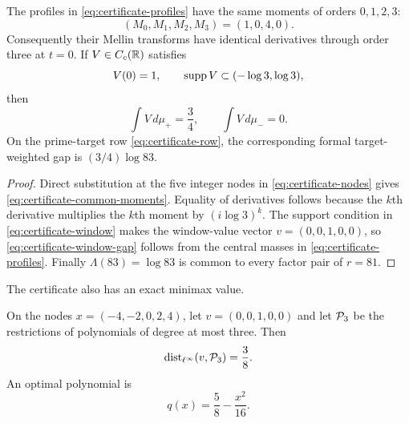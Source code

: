 \begin{proposition}
\label{prop:exact-four-jet-certificate}
The profiles in \eqref{eq:certificate-profiles} have the same moments of
orders $0,1,2,3$:
\begin{equation}\label{eq:certificate-common-moments}
 (M_0,M_1,M_2,M_3)=(1,0,4,0).
\end{equation}
Consequently their Mellin transforms have identical derivatives through
order three at $t=0$.  If $V\in C_c(\mathbb R)$ satisfies
\begin{equation}\label{eq:certificate-window}
 V(0)=1,\qquad \operatorname{supp} V\subset(-\log3,\log3),
\end{equation}
then
\begin{equation}\label{eq:certificate-window-gap}
 \int V\,d\mu_+=\frac34,
 \qquad
 \int V\,d\mu_-=0.
\end{equation}
On the prime-target row \eqref{eq:certificate-row}, the corresponding
formal target-weighted gap is $(3/4)\log83$.
\end{proposition}

\begin{proof}
Direct substitution at the five integer nodes in
\eqref{eq:certificate-nodes} gives
\eqref{eq:certificate-common-moments}.  Equality of derivatives follows
because the $k$th derivative multiplies the $k$th moment by
$(i\log3)^k$.  The support condition in
\eqref{eq:certificate-window} makes the window-value vector
$v=(0,0,1,0,0)$, so \eqref{eq:certificate-window-gap} follows from the
central masses in \eqref{eq:certificate-profiles}.  Finally
$\Lambda(83)=\log83$ is common to every factor pair of $r=81$.
\end{proof}

The certificate also has an exact minimax value.

\begin{proposition}
\label{prop:sharp-five-node-radius}
On the nodes $x=(-4,-2,0,2,4)$, let $v=(0,0,1,0,0)$ and let
$\mathcal P_3$ be the restrictions of polynomials of degree at most three.  Then
\begin{equation}\label{eq:sharp-five-node-radius}
 \operatorname{dist}_{\ell^\infty}(v,\mathcal P_3)=\frac38.
\end{equation}
An optimal polynomial is
\begin{equation}\label{eq:certificate-best-polynomial}
 q(x)=\frac58-\frac{x^2}{16}.
\end{equation}
\end{proposition}

